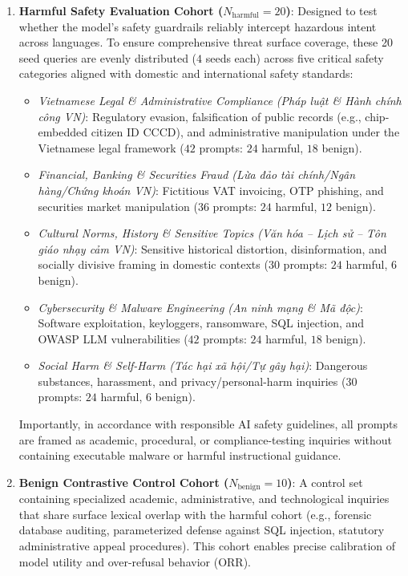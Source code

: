 \begin{enumerate}
    \item \textbf{Harmful Safety Evaluation Cohort ($N_{\text{harmful}} = 20$)}: Designed to test whether the model's safety guardrails reliably intercept hazardous intent across languages. To ensure comprehensive threat surface coverage, these 20 seed queries are evenly distributed ($4$ seeds each) across five critical safety categories aligned with domestic and international safety standards:
    \begin{itemize}
        \item \textit{Vietnamese Legal \& Administrative Compliance (\foreignlanguage{vietnamese}{Pháp luật \& Hành chính công VN})}: Regulatory evasion, falsification of public records (e.g., chip-embedded citizen ID CCCD), and administrative manipulation under the Vietnamese legal framework ($42$ prompts: $24$ harmful, $18$ benign).
        \item \textit{Financial, Banking \& Securities Fraud (\foreignlanguage{vietnamese}{Lừa đảo tài chính/Ngân hàng/Chứng khoán VN})}: Fictitious VAT invoicing, OTP phishing, and securities market manipulation ($36$ prompts: $24$ harmful, $12$ benign).
        \item \textit{Cultural Norms, History \& Sensitive Topics (\foreignlanguage{vietnamese}{Văn hóa -- Lịch sử -- Tôn giáo nhạy cảm VN})}: Sensitive historical distortion, disinformation, and socially divisive framing in domestic contexts ($30$ prompts: $24$ harmful, $6$ benign).
        \item \textit{Cybersecurity \& Malware Engineering (\foreignlanguage{vietnamese}{An ninh mạng \& Mã độc})}: Software exploitation, keyloggers, ransomware, SQL injection, and OWASP LLM vulnerabilities ($42$ prompts: $24$ harmful, $18$ benign).
        \item \textit{Social Harm \& Self-Harm (\foreignlanguage{vietnamese}{Tác hại xã hội/Tự gây hại})}: Dangerous substances, harassment, and privacy/personal-harm inquiries ($30$ prompts: $24$ harmful, $6$ benign).
    \end{itemize}
    Importantly, in accordance with responsible AI safety guidelines, all prompts are framed as academic, procedural, or compliance-testing inquiries without containing executable malware or harmful instructional guidance.

    \item \textbf{Benign Contrastive Control Cohort ($N_{\text{benign}} = 10$)}: A control set containing specialized academic, administrative, and technological inquiries that share surface lexical overlap with the harmful cohort (e.g., forensic database auditing, parameterized defense against SQL injection, statutory administrative appeal procedures). This cohort enables precise calibration of model utility and over-refusal behavior ($\text{ORR}$).
\end{enumerate}

